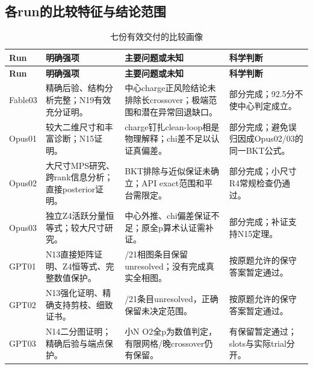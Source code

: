 \documentclass[11pt,a4paper]{article}
\begin{document}
\subsection{各run的比较特征与结论范围}
{\fontsize{9.0}{12.6}\selectfont
\setlength{\tabcolsep}{2.5pt}
\begin{longtable}{>{\raggedright\arraybackslash}p{}>{\raggedright\arraybackslash}p{}>{\raggedright\arraybackslash}p{}>{\raggedright\arraybackslash}p{}}
\caption{七份有效交付的比较画像}\\
\toprule
\textbf{Run} & \textbf{明确强项} & \textbf{主要问题或未知} & \textbf{科学判断}\tabularnewline
\midrule
\endfirsthead
\toprule
\textbf{Run} & \textbf{明确强项} & \textbf{主要问题或未知} & \textbf{科学判断}\tabularnewline
\midrule
\endhead
{}Fable03 & 精确后验、结构分析完整；N19有效充分证明。 & 中心charge正风险结论未排除长crossover；极端范围和潜在异常回退缺口。 & 部分完成；92.5分不使中心判定成立。\tabularnewline
{}Opus01 & 较大二维尺寸和丰富诊断；N15证明。 & charge钉扎clean-loop相是物理解释；chi差不足以认证真偏差。 & 部分完成；避免误归因成Opus02/03的同一BKT公式。\tabularnewline
{}Opus02 & 大尺寸MPS研究、跨rank信息分析；直接posterior证明。 & BKT排除与近似保证未确立；API exact范围和平台需限定。 & 部分完成；小尺寸R4常规检查仍通过。\tabularnewline
{}Opus03 & 独立Z4活跃分量恒等式；较大尺寸研究。 & 中心外推、chi偏差保证不足；原全p算术认证需补证。 & 部分完成；补证支持N15定理。\tabularnewline
{}GPT01 & N13直接矩阵证明、Z4恒等式、完整数值保护。 & 11/21相图条目保留unresolved；没有完成真实全相图。 & 按原题允许的保守答案暂定通过。\tabularnewline
{}GPT02 & N13强化证明、精确支持剪枝、细致证书。 & 12/21条目unresolved，正确保留未决定范围。 & 按原题允许的保守答案暂定通过。\tabularnewline
{}GPT03 & N14二分图证明；精确后验与端点保护。 & 小N O2全p为数值判定，有限网格/晚crossover仍有保留。 & 有保留暂定通过；slots与实际trial分开。\tabularnewline
\bottomrule
\end{longtable}
}
\end{document}
